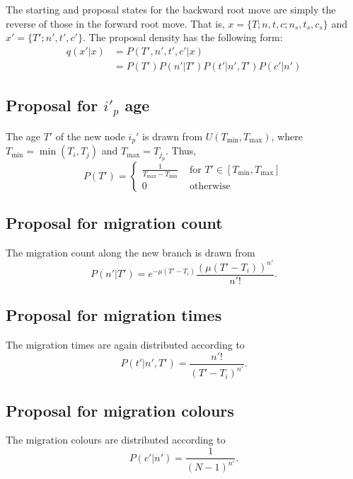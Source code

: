 \documentclass[a4paper,11pt]{article}
\begin{document}
The starting and proposal states for the backward root move are simply
the reverse of those in the forward root move. That is,
$x=\{T;n,t,c;n_s,t_s,c_s\}$ and $x'=\{T';n',t',c'\}$. The proposal
density has the following form:
\begin{align}
  q(x'|x) &= P(T',n',t',c'|x)\nonumber\\
&= P(T')P(n'|T')P(t'|n',T')P(c'|n')
\end{align}

\subsection{Proposal for $i'_p$ age}

The age $T'$ of the new node $i_p'$ is drawn from
$U(T_{\min},T_{\max})$, where $T_{\min}=\min(T_i,T_j)$ and $T_{\max}=T_{j_p}$. Thus,
\begin{equation}
  P(T')=\left\{\begin{array}{rl}
\frac{1}{T_{\max}-T_{\min}} & \text{ for }T'\in[T_{\min},T_{\max}]\\
0 & \text{ otherwise}\end{array}\right.
\end{equation}

\subsection{Proposal for migration count}

The migration count along the new branch is drawn from
\begin{equation}
  P(n'|T')=e^{-\mu(T'-T_i)}\frac{(\mu(T'-T_i))^{n'}}{n'!}.
\end{equation}

\subsection{Proposal for migration times}

The migration times are again distributed according to
\begin{equation}
  P(t'|n',T')=\frac{n'!}{(T'-T_i)^{n'}}.
\end{equation}

\subsection{Proposal for migration colours}
The migration colours are distributed according to
\begin{equation}
  P(c'|n')=\frac{1}{(N-1)^{n'}}.
\end{equation}
\end{document}
